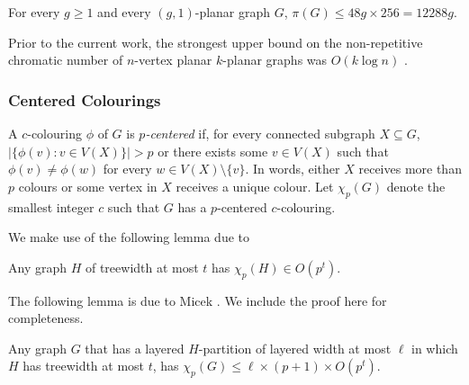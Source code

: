\documentclass{patmorin}
\begin{document}
\begin{cor}
  For every $g\ge 1$ and every $(g,1)$-planar graph $G$, $\pi(G)\le 48g\times 256= 12288g$.
\end{cor}

Prior to the current work, the strongest upper bound on the non-repetitive chromatic number of $n$-vertex planar $k$-planar graphs was $O(k\log n)$ \cite{dujmovic.morin.ea:layered}.

\subsubsection{Centered Colourings}

A $c$-colouring $\phi$ of $G$ is \emph{$p$-centered} if, for every connected subgraph $X\subseteq G$, $|\{\phi(v):v\in V(X)\}| > p$ or there exists some $v\in V(X)$ such that $\phi(v)\neq \phi(w)$ for every $w\in V(X)\setminus\{v\}$.  In words, either $X$ receives more than $p$ colours or some vertex in $X$ receives a unique colour.  Let $\chi_p(G)$ denote the smallest integer $c$ such that $G$ has a $p$-centered $c$-colouring.

We make use of the following lemma due to \citet{pilipczuk.siebertz:polynomial-arxiv,pilipczuk.siebertz:polynomial-soda}
\begin{lem}
  Any graph $H$ of treewidth at most $t$ has $\chi_p(H)\in O(p^t)$.
\end{lem}

The following lemma is due to Micek \cite{micek:personal}. We include the proof here for completeness.

\begin{lem}
  Any graph $G$ that has a layered $H$-partition of layered width at most $\ell$ in which $H$ has treewidth at most $t$, has $\chi_p(G)\le \ell\times (p+1)\times O(p^t)$.
\end{lem}
\end{document}
